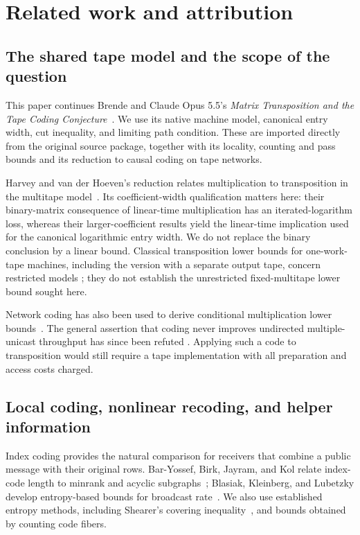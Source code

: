 \section{Related work and attribution}\label{sec:related-work}

\subsection{The shared tape model and the scope of the question}

This paper continues Brende and Claude Opus 5.5's \emph{Matrix Transposition
and the Tape Coding Conjecture}~\cite{FirstPaper2026}. We use its native
machine model, canonical entry width, cut inequality, and limiting path
condition. These are imported directly from the original
source package, together with its locality, counting and pass bounds and its
reduction to causal coding on tape networks.

Harvey and van der Hoeven's reduction relates multiplication to
transposition in the multitape model~\cite{HvdH2025}. Its coefficient-width
qualification matters here: their binary-matrix consequence of linear-time
multiplication has an iterated-logarithm loss, whereas their larger-coefficient
results yield the linear-time implication used for the canonical logarithmic
entry width. We do not replace the binary conclusion by a linear bound.
Classical transposition lower bounds for one-work-tape machines, including
the version with a separate output tape, concern restricted models
\cite{DMS1991,DietzfelbingerMaass1993}; they do not establish the unrestricted
fixed-multitape lower bound sought here.

Network coding has also been used to derive conditional multiplication
lower bounds~\cite{AFKL2019}. The general assertion that coding never improves
undirected multiple-unicast throughput has since been refuted
\cite{BravermanHe2026,ZhangLiLi2026}. Applying such a code to transposition would still require a tape
implementation with all preparation and access costs charged.

\subsection{Local coding, nonlinear recoding, and helper information}

Index coding provides the natural comparison for receivers that combine a
public message with their original rows. Bar-Yossef, Birk, Jayram, and Kol
relate index-code length to minrank and acyclic subgraphs~\cite{BBJK2011};
Blasiak, Kleinberg, and Lubetzky develop entropy-based bounds for broadcast
rate~\cite{BKL2011}. We also use established entropy methods, including Shearer's covering
inequality~\cite{CGFS1986}, and bounds obtained by counting code fibers.

